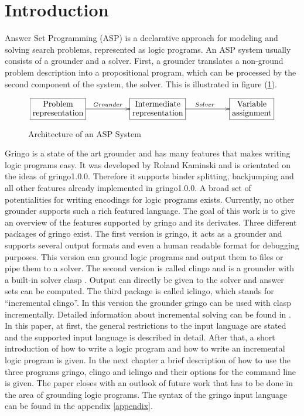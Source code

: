 \documentclass[a4paper,10pt]{article}
\begin{document}
\section{Introduction}
Answer Set Programming (ASP) \cite{baral02a} is a declarative approach for modeling and solving search problems, represented as logic programs.
An ASP system usually consists of a grounder and a solver.
First, a grounder translates a non-ground problem description into a propositional program, which can be processed by the second component of the system, the solver. This is illustrated in figure (\ref{fig:ASP}).
\begin{figure}[h]
\[
\xymatrix{*+[F]\txt{Problem\\representation}\ar[rr]^{Grounder}&&
		*+[F]\txt{Intermediate\\ representation} \ar[rr]^{Solver}&&
		*+[F]\txt{Variable\\ assignment}}
\]
\caption{Architecture of an ASP System}
\label{fig:ASP}
\end{figure}
Gringo is a state of the art grounder and has many features that makes writing logic programs easy.
It was developed by Roland Kaminski and is orientated on the ideas of gringo1.0.0\cite{gringopaper}.
Therefore it supports binder splitting, backjumping and all other features already implemented in gringo1.0.0.
A broad set of potentialities for writing encodings for logic programs exists. Currently, no other grounder supports such a rich featured language.
The goal of this work is to give an overview of the features supported by gringo and its derivates.
Three different packages of gringo exist.
The first version is gringo, it acts as a grounder and supports several output formats and even a human readable format for debugging purposes. This version can ground logic programs and output them to files or pipe them to a solver.
The second version is called clingo and is a grounder with a built-in solver clasp \cite{gekanesc07b}.
Output can directly be given to the solver and answer sets can be computed.
The third package is called iclingo, which stands for ``incremental clingo''. In this version the grounder gringo can be used with clasp incrementally. Detailed information about incremental solving can be found in \cite{gekaosscth08a}.
In this paper, at first, the general restrictions to the input language are stated and the supported input language is described in detail. After that, a short introduction of how to write a logic program and how to write an incremental logic program is given. In the next chapter a brief description of how to use the three programs gringo, clingo and iclingo and their options for the command line is given. The paper closes with an outlook of future work that has to be done in the area of grounding logic programs.
The syntax of the gringo input language can be found in the appendix \ref{appendix}.
\end{document}
